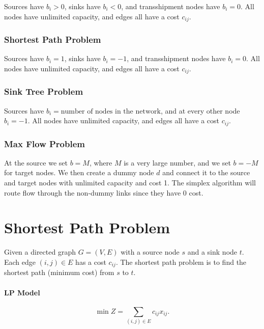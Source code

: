 \documentclass{report}
\begin{document}
Sources have $b_i>0$, sinks have $b_i<0$, and transshipment nodes have $b_i=0$. All nodes have unlimited capacity, and edges all have a cost $c_{ij}$.

\subsubsection{Shortest Path Problem}

Sources have $b_i=1$, sinks have $b_i=-1$, and transshipment nodes have $b_i=0$. All nodes have unlimited capacity, and edges all have a cost $c_{ij}$.

\subsubsection{Sink Tree Problem}

Sources have $b_i=\text{number of nodes in the network}$, and at every other node $b_i=-1$. All nodes have unlimited capacity, and edges all have a cost $c_{ij}$.

\subsubsection{Max Flow Problem}

At the source we set $b=M$, where $M$ is a very large number, and we set $b=-M$ for target nodes. We then create a dummy node $d$ and connect it to the source and target nodes with unlimited capacity and cost 1. The simplex algorithm will route flow through the non-dummy links since they have 0 cost.


\section{Shortest Path Problem}

Given a directed graph $G=(V,E)$ with a source node $s$ and a sink node $t$. Each edge $(i,j)\in E$ has a cost $c_{ij}$. The shortest path problem is to find the shortest path (minimum cost) from $s$ to $t$.

\paragraph{LP Model}

\[
	\min Z = \sum_{(i,j)\in E} c_{ij}x_{ij}
	.\]
\end{document}
